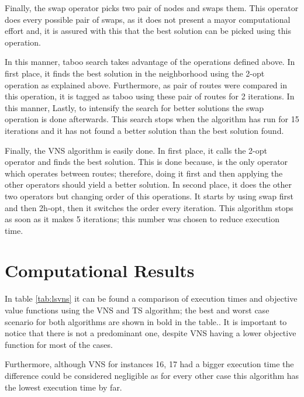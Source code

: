 \documentclass[10pt,twoside]{article}
\begin{document}
Finally, the swap operator picks two pair of nodes and swaps
them. This operator does every possible pair of swaps, as it does not
present a mayor computational effort and, it is assured with this that
the best solution can be picked using this operation.

In this manner, taboo search takes advantage of the operations defined
above. In first place, it finds the best solution in the neighborhood
using the 2-opt operation as explained above. Furthermore, as pair of
routes were compared in this operation, it is tagged as taboo using
these pair of routes for 2 iterations. In this manner, Lastly, to intensify the
search for better solutions the swap operation is done
afterwards. This search stops when the algorithm has run for 15
iterations and it has not found a better solution than the best
solution found.

Finally, the VNS algorithm is easily done. In first place, it calls
the 2-opt operator and finds the best solution. This is done because,
is the only operator which operates between routes; therefore, doing
it first and then applying the other operators should yield a better
solution. In second place, it does the other two operators but
changing order of this operations. It starts by using swap first and
then 2h-opt, then it switches the order every iteration. This
algorithm stops as soon as it makes 5 iterations; this number was
chosen to reduce execution time.

\section{Computational Results}\label{sec_results}

In table \ref{tab:lsvns} it can be found a comparison of execution
times and objective value functions using the VNS and TS algorithm;
the best and worst case scenario for both algorithms are shown in bold
in the table.. It is important to notice that there is not a
predominant one, despite VNS having a lower objective function for
most of the cases.

Furthermore, although VNS for instances 16, 17 had a bigger execution
time the difference could be considered negligible as for every other
case this algorithm has the lowest execution time by far.
\end{document}
